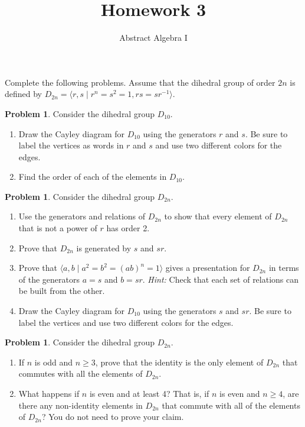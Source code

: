 \documentclass[11pt]{scrartcl}
\theoremstyle{definition}
\newtheorem{problem}[theorem]{Problem}
\begin{document}
\title{Homework 3}
\subtitle{Abstract Algebra I}
\date{}

\maketitle
\thispagestyle{fancy}

Complete the following problems. Assume that the dihedral group of order $2n$ is defined by $D_{2n}=\langle r,s\mid r^n=s^2=1, rs=sr^{-1}\rangle$.

\begin{problem}
Consider the dihedral group $D_{10}$.
\begin{enumerate}[label=\rm{(\alph*)}]
\item Draw the Cayley diagram for $D_{10}$ using the generators $r$ and $s$.  Be sure to label the vertices as words in $r$ and $s$ and use two different colors for the edges.
\item Find the order of each of the elements in $D_{10}$.
\end{enumerate}
\end{problem}

\begin{problem}
Consider the dihedral group $D_{2n}$.
\begin{enumerate}[label=\rm{(\alph*)}]
\item Use the generators and relations of $D_{2n}$ to show that every element of $D_{2n}$ that is not a power of $r$ has order 2. 
\item Prove that $D_{2n}$ is generated by $s$ and $sr$.
\item Prove that $\langle a,b\mid a^2=b^2=(ab)^n=1\rangle$ gives a presentation for $D_{2n}$ in terms of the generators $a=s$ and $b=sr$. \emph{Hint:} Check that each set of relations can be built from the other.
\item Draw the Cayley diagram for $D_{10}$ using the generators $s$ and $sr$.  Be sure to label the vertices and use two different colors for the edges.
\end{enumerate}
\end{problem}

\begin{problem}
Consider the dihedral group $D_{2n}$.
\begin{enumerate}[label=\rm{(\alph*)}]
\item If $n$ is odd and $n\geq 3$, prove that the identity is the only element of $D_{2n}$ that commutes with all the elements of $D_{2n}$.
\item What happens if $n$ is even and at least 4?  That is, if $n$ is even and $n\geq 4$, are there any non-identity elements in $D_{2n}$ that commute with all of the elements of $D_{2n}$?  You do not need to prove your claim.
\end{enumerate}
\end{problem}
\end{document}
